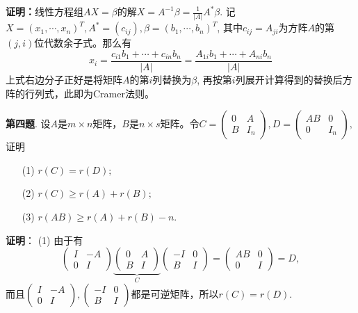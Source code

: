 \newpageorvspace

{\bf 证明：}线性方程组$AX=\beta$的解$X = A^{-1}\beta = \frac{1}{|A|}A^*\beta$. 记$X = (x_1, \cdots, x_n)^T, A^* = (c_{ij}), \beta = (b_1, \cdots, b_n)^T$, 其中$c_{ij} = A_{ji}$为方阵$A$的第$(j,i)$位代数余子式。那么有
$$x_i = \frac{c_{i1}b_1 + \cdots + c_{in}b_n}{|A|} = \frac{A_{1i}b_1 + \cdots + A_{ni}b_n}{|A|}$$
上式右边分子正好是将矩阵$A$的第$i$列替换为$\beta$, 再按第$i$列展开计算得到的替换后方阵的行列式，此即为Cramer法则。

\fi  %

\newpageorvspace

{\bf 第四题}. 设$A$是$m\times n$矩阵，$B$是$n\times s$矩阵。令$C = \begin{pmatrix} 0 & A \\ B & I_n \end{pmatrix}, D = \begin{pmatrix} AB & 0 \\ 0 & I_n \end{pmatrix},$ 证明
\begin{itemize}
\item[(1)] $r(C) = r(D);$
\item[(2)] $r(C) \geqslant r(A) + r(B);$
\item[(3)] $r(AB) \geqslant r(A) + r(B) - n.$
\end{itemize}

\ifIncludeAnswer

\newpageorvspace

{\bf 证明}： (1) 由于有
$$\begin{pmatrix} I & -A \\ 0 & I \end{pmatrix} \underbrace{\begin{pmatrix} 0 & A \\ B & I \end{pmatrix}}_{C} \begin{pmatrix} -I & 0 \\ B & I \end{pmatrix} = \begin{pmatrix} AB & 0 \\ 0 & I \end{pmatrix} = D,$$
而且$\begin{pmatrix} I & -A \\ 0 & I \end{pmatrix}, \begin{pmatrix} -I & 0 \\ B & I \end{pmatrix}$都是可逆矩阵，所以$r(C) = r(D).$

